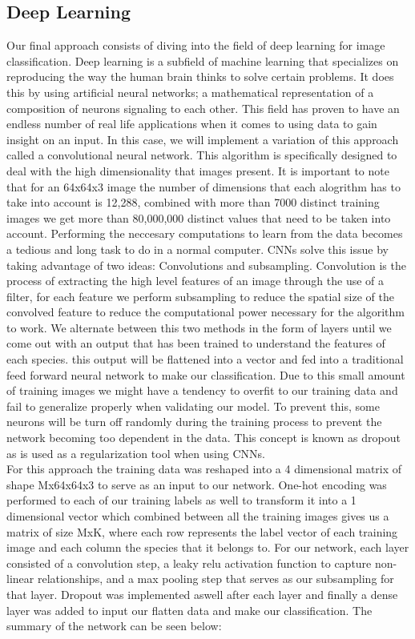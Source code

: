\documentclass[11pt]{article}
\begin{document}
\begin{singlespace}
\subsection{Deep Learning}
Our final approach consists of diving into the field of deep learning for image classification. Deep learning is a subfield of machine learning that specializes on reproducing the way the human brain thinks to solve certain problems. It does this by using artificial neural networks; a mathematical representation of a composition of neurons signaling to each other. This field has proven to have an endless number of real life applications when it comes to using data to gain insight on an input. In this case, we will implement a variation of this approach called a convolutional neural network. This algorithm is specifically designed to deal with the high dimensionality that images present. It is important to note that for an 64x64x3 image the number of dimensions that each alogrithm has to take into account is 12,288, combined with more than 7000 distinct training images we get more than 80,000,000 distinct values that need to be taken into account. Performing the neccesary computations to learn from the data becomes a tedious and long task to do in a normal computer. CNNs solve this issue by taking advantage of two ideas: Convolutions and subsampling. Convolution is the process of extracting the high level features of an image through the use of a filter, for each feature we perform subsampling to reduce the spatial size of the convolved feature to reduce the computational power necessary for the algorithm to work. We alternate between this two methods in the form of layers until we come out with an output that has been trained to understand the features of each species. this output will be flattened into a vector and fed into a traditional feed forward neural network to make our classification. Due to this small amount of training images we might have a tendency to overfit to our training data and fail to generalize properly when validating our model. To prevent this, some neurons will be turn off randomly during the training process to prevent the network becoming too dependent in the data. This concept is known as dropout as is used as a regularization tool when using CNNs. \\

For this approach the training data was reshaped into a 4 dimensional matrix of shape Mx64x64x3 to serve as an input to our network. One-hot encoding was performed to each of our training labels as well to transform it into a 1 dimensional vector which combined between all the training images gives us a matrix of size MxK, where each row represents the label vector of each training image and each column the species that it belongs to. For our network, each layer consisted of a convolution step, a leaky relu activation function to capture non-linear relationships, and a max pooling step that serves as our subsampling for that layer. Dropout was implemented aswell after each layer and finally a dense layer was added to input our flatten data and make our classification. The summary of the network can be seen below: \\


\end{singlespace}
\end{document}
